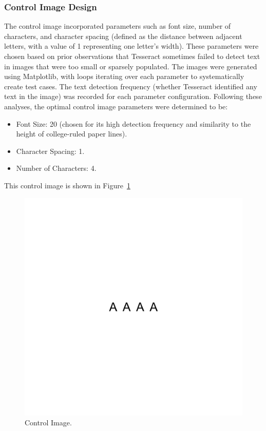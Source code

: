 \documentclass[10pt,twocolumn]{article}
\begin{document}
\subsubsection{Control Image Design}
The control image incorporated parameters such as font size, number of characters, and character spacing (defined as the distance between adjacent letters, with a value of 1 representing one letter’s width). These parameters were chosen based on prior observations that Tesseract sometimes failed to detect text in images that were too small or sparsely populated. The images were generated using Matplotlib, with loops iterating over each parameter to systematically create test cases. The text detection frequency (whether Tesseract identified any text in the image) was recorded for each parameter configuration.
Following these analyses, the optimal control image parameters were determined to be:
\begin{itemize}
    \item Font Size: 20 (chosen for its high detection frequency and similarity to the height of college-ruled paper lines).
    \item Character Spacing: 1.
    \item Number of Characters: 4.
\end{itemize}
This control image is shown in Figure~\ref{fig:Control}
\begin{figure}[h!]
    \centering
    \includegraphics[width=\linewidth]{Figures/Control_Image.png}
    \caption{Control Image.}
    \label{fig:Control}
\end{figure}
\end{document}
